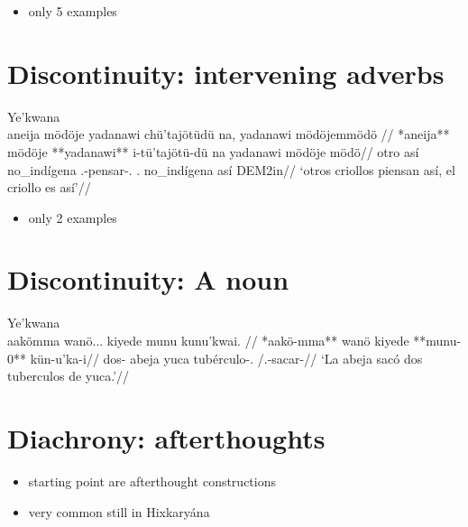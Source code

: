 \documentclass[10pt]{article}
\begin{document}
\begin{itemize}
\tightlist
\item
  only 5 examples
\end{itemize}

\section{Discontinuity: intervening adverbs}

\ex Ye'kwana \parencite{caceresDByekwana} \\
\label{convchur-009}    \begingl
    \glpreamble aneija mödöje yadanawi chü'tajötüdü na, yadanawi mödöjemmödö //
    \gla **aneija** mödöje **yadanawi** i-tü'tajötü-dü na yadanawi mödöje mödö//
    \glb otro así no\_indígena .-pensar-. . no\_indígena así DEM2in//
        \glft ‘otros criollos piensan así, el criollo es así’//  
    \endgl 
\xe

\begin{itemize}
\tightlist
\item
  only 2 examples
\end{itemize}

\section{Discontinuity: A noun}

\ex Ye'kwana \parencite{caceresDByekwana} \\
\label{ctoabjpic-008}    \begingl
    \glpreamble aakömma wanö... kiyede munu kunu'kwai. //
    \gla **aakö-mma** wanö kiyede **munu-0** kün-u'ka-i//
    \glb dos- abeja yuca tubérculo-. /.-sacar-//
        \glft ‘La abeja sacó dos tuberculos de yuca.’//  
    \endgl 
\xe

\section{Diachrony: afterthoughts}

\begin{itemize}
\tightlist
\item
  starting point are afterthought constructions
\item
  very common still in Hixkaryána
  \parencites[101-104, 129-135]{hixkaryanaderby1985}
\end{itemize}
\end{document}

